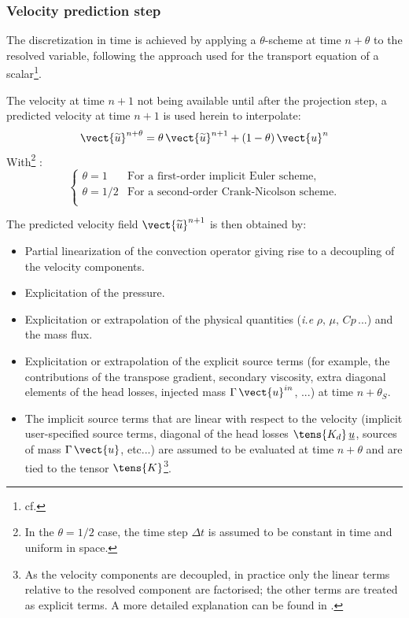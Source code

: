 \subsubsection*{Velocity prediction step}
The discretization in time is achieved by applying a $\theta$-scheme
at time $n+\theta$ to the resolved variable, following the approach used
for the transport equation of a scalar\footnote{cf. }.

The velocity at time $n+1$ not being available until after the projection
step, a predicted velocity at time $n+1$ is used herein to interpolate:
\begin{equation}
\label{eq:navstv:theta_scheme}
\vect{\widetilde{u}}^{n+\theta} = \theta\, {\vect{\widetilde{u}}}^{n+1}+(1-\theta)\, \vect{u}^{n}
\end{equation}
With\footnote{In the $\theta = 1/2$ case, the time step $\Delta t$ is assumed
to be constant in time and uniform in space.} :
\begin{equation}
\left\{
\begin{array}{ll}
\theta = 1   & \text{For a first-order implicit Euler scheme,}\\
\theta = 1/2 & \text{For a second-order Crank-Nicolson scheme.}\\
\end{array}
\right.
\end{equation}

The predicted velocity field ${\vect{\widetilde{u}}^{n+1}}$ is then
obtained by:

\begin{itemize}
\item Partial linearization of the convection operator giving rise to a
decoupling of the velocity components.
\item Explicitation of the pressure.
\item Explicitation or extrapolation of the physical quantities (\emph{i.e}
$\rho,\,\mu,\,Cp\,...$) and the mass flux.
\item Explicitation or extrapolation of the explicit source terms 
(for example, the contributions of the transpose gradient, secondary viscosity, 
extra diagonal elements of the head losses, injected mass $\Gamma\,\vect{u}^{in}$, ...) 
at time $n+\theta_{S}$. 
\item The implicit source terms that are linear with respect to the velocity
(implicit user-specified source terms, diagonal of the head losses
$\tens{K_d}\,\underline{u}$, sources of mass $\Gamma\,\vect{u}$, etc...)
are assumed to be evaluated at time $n+\theta$ and are tied to the tensor
$\tens{K}$\footnote{As the velocity components are decoupled, in practice only
the linear terms relative to the resolved component are factorised; the other terms are treated as explicit terms. A more detailed explanation can be found in .}.
\end{itemize}

